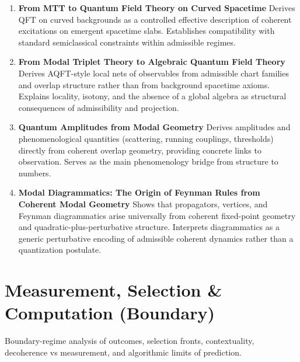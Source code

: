 \documentclass[11pt]{article}
\begin{document}
\begin{enumerate}[leftmargin=*]
\item \textbf{From MTT to Quantum Field Theory on Curved Spacetime} Derives QFT on curved backgrounds as a controlled effective description of coherent excitations on emergent spacetime slabs. Establishes compatibility with standard semiclassical constraints within admissible regimes.
\item \textbf{From Modal Triplet Theory to Algebraic Quantum Field Theory}
Derives AQFT-style local nets of observables from admissible chart families and overlap structure rather than from background spacetime axioms. Explains locality, isotony, and the absence of a global algebra as structural consequences of admissibility and projection.
\item \textbf{Quantum Amplitudes from Modal Geometry} Derives amplitudes and phenomenological quantities (scattering, running couplings, thresholds) directly from coherent overlap geometry, providing concrete links to observation. Serves as the main phenomenology bridge from structure to numbers.
\item \textbf{Modal Diagrammatics: The Origin of Feynman Rules from Coherent Modal Geometry}
Shows that propagators, vertices, and Feynman diagrammatics arise universally from coherent fixed-point geometry and quadratic-plus-perturbative structure. Interprets diagrammatics as a generic perturbative encoding of admissible coherent dynamics rather than a quantization postulate.

\end{enumerate}

\section{Measurement, Selection \& Computation (Boundary)}
Boundary-regime analysis of outcomes, selection fronts, contextuality, decoherence vs measurement, and algorithmic limits of prediction.
\end{document}
